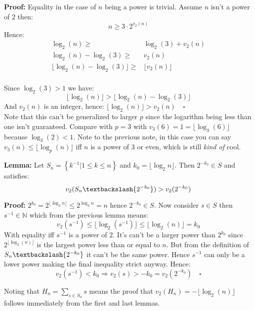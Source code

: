 {\textbf{Proof:}} Equality in the case of $n$ being a power is trivial.
Assume $n$ isn't a power of $2$ then:
\[n \geq 3\cdot 2^{v_2(n)}\]
Hence:
\begin{equation*}
\begin{aligned}
	\log_2(n) \geq& \log_2(3)+v_2(n) \\
	\log_2(n)-\log_2(3) \geq& v_2(n) \\
	\lfloor\log_2(n)-\log_2(3)\rfloor \geq& \lfloor v_2(n) \rfloor \\
\end{aligned}
\end{equation*}

Since $\log_2(3) > 1$ we have:
\[\lfloor \log_2 (n) \rfloor > \lfloor\log_2(n)-\log_2(3)\rfloor\]
And $v_2(n)$ is an integer, hence:
$\lfloor \log_2 (n) \rfloor > v_2(n)\quad \square$
\\

Note that this can't be generalized to larger $p$ since the logarithm being less than one isn't guaranteed.
Compare with $p=3$ with $v_3(6) = 1 = \lfloor \log_3(6) \rfloor$ because $\log_3(2) < 1$.
Note to the previous note, in this case you can say $v_3(n) \leq \lfloor \log_p(n) \rfloor$ iff $n$ is a power of $3$ or even, which is still \emph{kind of} cool.

{\textbf{Lemma:}} Let $S_n = \left\{k^{-1} | 1 \leq k \leq n\right\}$ and $k_0 = \lfloor\log_2 n\rfloor$.
Then $2^{-k_0} \in S$ and satisfies:
\[v_2(S_n\textbackslash\{2^{-k_0}\}) > v_2(2^{-k_0})\]

{\textbf{Proof:}} $2^{k_0} = 2^{\lfloor \log_2 n \rfloor} \leq 2^{\log_2 n} = n$ hence $2^{-k_0} \in S$.
Now consider $s\in S$ then $s^{-1} \in \mathbb{N}$ which from the previous lemma means:
\[ v_2(s^{-1}) \leq \lfloor \log_2(s^{-1})\rfloor \leq \lfloor \log_2(n)\rfloor = k_0\]
With equality iff $s^{-1}$ is a power of $2$.
It's can't be a larger power than $2^{k_0}$ since $2^{\lfloor \log_2 (n) \rfloor}$ is the largest power less than or equal to $n$.
But from the definition of $S_n\textbackslash\{2^{-k_0}\}$ it can't be the same power.
Hence $s^{-1}$ can only be a lower power making the final inequality strict anyway.
Hence:
\[ v_2(s^{-1}) < k_0 \Rightarrow v_2(s) > -k_0 = v_2(2^{-k_0})\quad \square\]

Noting that $H_n = \sum_{s\in S_n}s$ means the proof that $v_2(H_n) = -\lfloor \log_2 (n) \rfloor$ follows immediately from the first and last lemmas.

